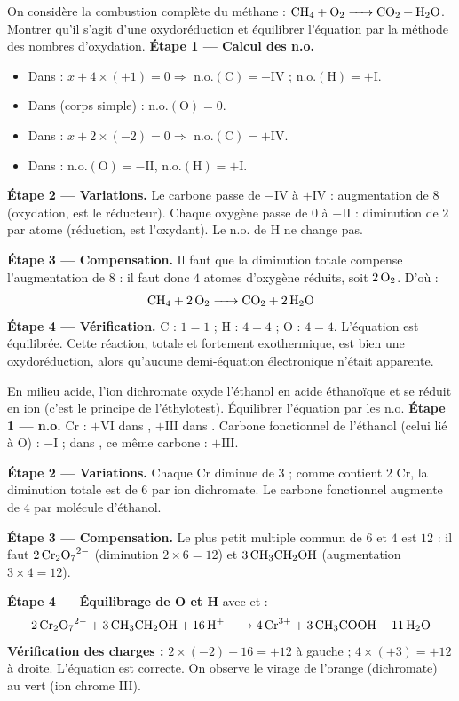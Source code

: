 \documentclass[11pt]{article}
\begin{document}
\begin{exoresolu}
On considère la combustion complète du méthane : $\ce{CH4 + O2 -> CO2 + H2O}$. Montrer qu'il s'agit d'une oxydoréduction et équilibrer l'équation par la méthode des nombres d'oxydation.
\tcblower
\textbf{Étape 1 — Calcul des n.o.}
\begin{itemize}
\item Dans  : $x + 4 \times (+1) = 0 \Rightarrow$ n.o.$(\mathrm{C}) = -\mathrm{IV}$ ; n.o.$(\mathrm{H}) = +\mathrm{I}$.
\item Dans  (corps simple) : n.o.$(\mathrm{O}) = 0$.
\item Dans  : $x + 2 \times (-2) = 0 \Rightarrow$ n.o.$(\mathrm{C}) = +\mathrm{IV}$.
\item Dans  : n.o.$(\mathrm{O}) = -\mathrm{II}$, n.o.$(\mathrm{H}) = +\mathrm{I}$.
\end{itemize}
\textbf{Étape 2 — Variations.} Le carbone passe de $-\mathrm{IV}$ à $+\mathrm{IV}$ : augmentation de $8$ (oxydation,  est le réducteur). Chaque oxygène passe de $0$ à $-\mathrm{II}$ : diminution de $2$ par atome (réduction,  est l'oxydant). Le n.o. de H ne change pas.

\textbf{Étape 3 — Compensation.} Il faut que la diminution totale compense l'augmentation de $8$ : il faut donc $4$ atomes d'oxygène réduits, soit $2\,\ce{O2}$. D'où :
\[ \ce{CH4 + 2 O2 -> CO2 + 2 H2O} \]
\textbf{Étape 4 — Vérification.} C : $1 = 1$ ; H : $4 = 4$ ; O : $4 = 4$. L'équation est équilibrée. Cette réaction, totale et fortement exothermique, est bien une oxydoréduction, alors qu'aucune demi-équation électronique n'était apparente.
\end{exoresolu}

\begin{exoresolu}
En milieu acide, l'ion dichromate  oxyde l'éthanol  en acide éthanoïque  et se réduit en ion  (c'est le principe de l'éthylotest). Équilibrer l'équation par les n.o.
\tcblower
\textbf{Étape 1 — n.o.} Cr : $+\mathrm{VI}$ dans , $+\mathrm{III}$ dans . Carbone fonctionnel de l'éthanol (celui lié à O) : $-\mathrm{I}$ ; dans , ce même carbone : $+\mathrm{III}$.

\textbf{Étape 2 — Variations.} Chaque Cr diminue de $3$ ; comme  contient $2$ Cr, la diminution totale est de $6$ par ion dichromate. Le carbone fonctionnel augmente de $4$ par molécule d'éthanol.

\textbf{Étape 3 — Compensation.} Le plus petit multiple commun de $6$ et $4$ est $12$ : il faut $2\,\ce{Cr2O7^2-}$ (diminution $2 \times 6 = 12$) et $3\,\ce{CH3CH2OH}$ (augmentation $3 \times 4 = 12$).

\textbf{Étape 4 — Équilibrage de O et H} avec  et  :
\[ \ce{2 Cr2O7^2- + 3 CH3CH2OH + 16 H+ -> 4 Cr^3+ + 3 CH3COOH + 11 H2O} \]
\textbf{Vérification des charges :} $2 \times (-2) + 16 = +12$ à gauche ; $4 \times (+3) = +12$ à droite. L'équation est correcte. On observe le virage de l'orange (dichromate) au vert (ion chrome III).
\end{exoresolu}
\end{document}
